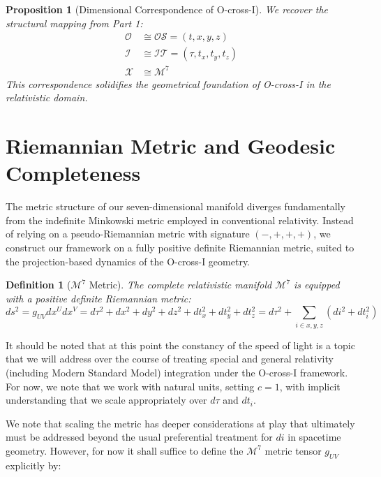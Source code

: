 \documentclass{article}
\newtheorem{definition}{Definition}
\newtheorem{proposition}{Proposition}
\begin{document}
\begin{proposition}[Dimensional Correspondence of O-cross-I]
We recover the structural mapping from Part 1:
\begin{align}
\mathcal{O} &\cong \mathcal{OS} = (t, x, y, z) \\
\mathcal{I} &\cong \mathcal{IT} = (\tau, t_x, t_y, t_z) \\
\mathcal{X} &\cong \mathcal{M}^7
\end{align}
This correspondence solidifies the geometrical foundation of O-cross-I in the relativistic domain.
\end{proposition}




\section{Riemannian Metric and Geodesic Completeness}

The metric structure of our seven-dimensional manifold diverges fundamentally from the indefinite Minkowski metric employed in conventional relativity. Instead of relying on a pseudo-Riemannian metric with signature $(-,+,+,+)$, we construct our framework on a fully positive definite Riemannian metric, suited to the projection-based dynamics of the O-cross-I geometry.

\begin{definition}[$\mathcal{M}^7$ Metric]
The complete relativistic manifold $\mathcal{M}^7$ is equipped with a positive definite Riemannian metric:
\begin{equation}
ds^2 = g_{UV}dx^U dx^V = d\tau^2 + dx^2 + dy^2 + dz^2 + dt_x^2 + dt_y^2 + dt_z^2 = d\tau^2 + \sum_{i\in x,y,z}{(di^2 + dt_i^2)}
\end{equation}
\end{definition}

It should be noted that at this point the constancy of the speed of light is a topic that we will address over the course of treating special and general relativity (including Modern Standard Model) integration under the O-cross-I framework. For now, we note that we work with natural units, setting $c=1$, with implicit understanding that we scale appropriately over $d\tau$ and $dt_i$. 

We note that scaling the metric has deeper considerations at play that ultimately must be addressed beyond the usual preferential treatment for $di$ in spacetime geometry. However, for now it shall suffice to define the $\mathcal{M}^7$ metric tensor $g_{UV}$ explicitly by:
\end{document}
